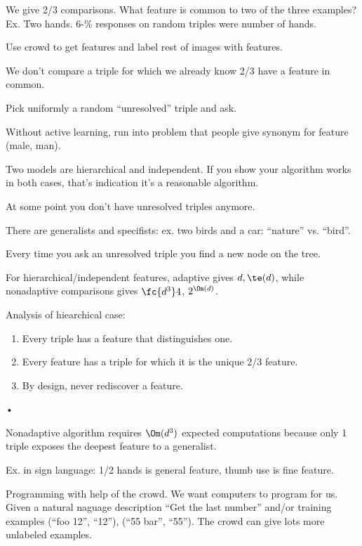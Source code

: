 We give 2/3 comparisons. What feature is common to two of the three examples? Ex. Two hands. 6-\% responses on random triples were number of hands.

Use crowd to get features and label rest of images with features.

We don't compare  a triple for which we already know 2/3 have a feature in common. 

Pick uniformly a random ``unresolved'' triple and ask.


Without active learning, run into problem that people give synonym for feature (male, man).

Two models are hierarchical and independent. If you show your algorithm works in both cases, that's indication it's a reasonable algorithm.

At some point you don't have unresolved triples anymore.

There are generalists and specifists: ex. two birds and a car: ``nature'' vs. ``bird''.

Every time you ask an unresolved triple you find a new node on the tree. 

For hierarchical/independent features, adaptive gives $d,\te(d)$, while nonadaptive comparisons gives $\fc{d^3}4$, $2^{\Om(d)}$. 

Analysis of hiearchical case: 
\begin{enumerate}
\item
Every triple has a feature that distinguishes one. 
\item
Every feature has a triple for which it is the unique 2/3 feature.
\item
By design, never rediscover a feature.
\end{enumerate}•

Nonadaptive algorithm requires $\Om(d^3)$ expected computations because only 1 triple exposes the deepest feature to a generalist.

Ex. in sign language: 1/2 hands is general feature, thumb use is fine feature.


Programming with help of the crowd. We want computers to program for us. Given a natural naguage description ``Get the last number'' and/or training examples (``foo 12'', ``12''), (``55 bar'', ``55''). The crowd can give lots more unlabeled examples. 

